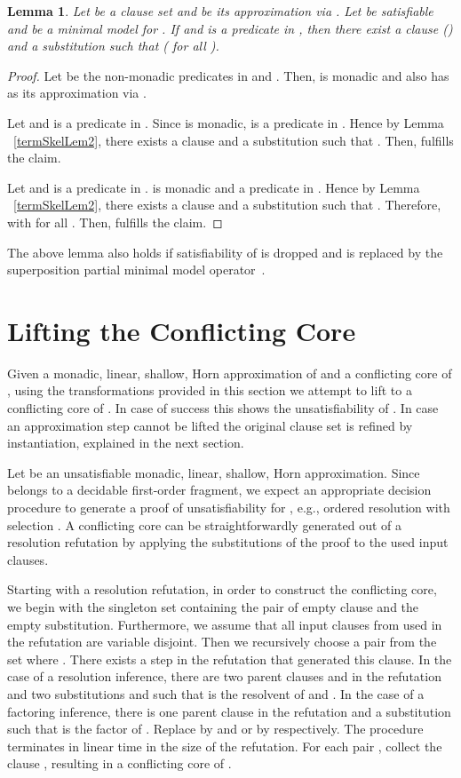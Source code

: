\documentclass{llncs}
\newtheorem{lem}[theorem]{Lemma}
\begin{document}
\begin{lem}\label{termSkelLem}
Let  be a clause set and  be its approximation via  . Let  be
satisfiable and  be a minimal model for .
If   
and  is a predicate in , then there exist a clause 
  ()
and a substitution  such that
 ( for all ).
\end{lem}


\begin{proof}
Let  be the non-monadic predicates in  and . Then,  is monadic and also has  as its approximation via .

 Let  and  is a predicate in . Since  is monadic,  is a predicate in .
Hence by Lemma ~\ref{termSkelLem2}, there exists a clause  
and a substitution  such that . 
Then,  fulfills the claim.

Let  and  is a predicate in .  is monadic and a predicate in .
Hence by Lemma ~\ref{termSkelLem2}, there exists a clause  
and a substitution  such that .
Therefore,  with   for all .
Then,  fulfills the claim.
\end{proof}

The above lemma also holds if satisfiability of  is dropped and  is replaced
by the superposition partial minimal model operator~\cite{Weidenbach01handbook}.


\section{Lifting the Conflicting Core} \label{sec:lifting}

Given a monadic, linear, shallow, Horn approximation  of  
and a conflicting core  of , using the transformations
provided in this section we attempt to lift  to a conflicting
core  of .
In case of success this shows the unsatisfiability of .
In case an approximation step cannot be lifted the original clause
set is refined by instantiation, explained in the next section.

Let  be an unsatisfiable monadic, linear, shallow, Horn approximation. 
Since  belongs to a decidable first-order fragment,
we expect an appropriate decision procedure to generate a proof of unsatisfiability for , 
e.g., ordered resolution with selection \cite{Weidenbach99cade}.
A conflicting core can be straightforwardly generated out of a resolution refutation 
by applying the substitutions of the proof to the used input clauses.

Starting with a resolution refutation, in order to construct the conflicting core, 
we begin with the singleton set containing the pair of empty clause and the empty substitution.
Furthermore, we assume that all input clauses from  used in the refutation are
variable disjoint. 
Then we recursively choose a pair  from the set where .
There exists a step in the refutation that generated this clause. 
In the case of a resolution inference, there are two parent 
clauses  and  in the refutation and two substitutions  and 
such that  is the resolvent of  and .
In the case of a factoring inference, there is one parent 
clause  in the refutation and a substitution 
such that  is the factor of .  
Replace   by  and  or 
by  respectively.
The procedure terminates in linear time in the size of the refutation.
For each pair , collect the clause , resulting
in a conflicting core  of .
\end{document}
